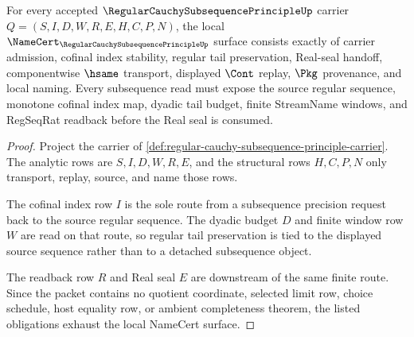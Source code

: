 \begin{theorem}
\label{thm:regular-cauchy-subsequence-principle-namecert-obligations}
For every accepted $\RegularCauchySubsequencePrincipleUp$ carrier $Q=(S,I,D,W,R,E,H,C,P,N)$, the local $\NameCert_{\RegularCauchySubsequencePrincipleUp}$ surface consists exactly of carrier admission, cofinal index stability, regular tail preservation, Real-seal handoff, componentwise $\hsame$ transport, displayed $\Cont$ replay, $\Pkg$ provenance, and local naming. Every subsequence read must expose the source regular sequence, monotone cofinal index map, dyadic tail budget, finite StreamName windows, and RegSeqRat readback before the Real seal is consumed.
\end{theorem}
\begin{proof}
Project the carrier of \autoref{def:regular-cauchy-subsequence-principle-carrier}. The analytic rows are $S,I,D,W,R,E$, and the structural rows $H,C,P,N$ only transport, replay, source, and name those rows.

The cofinal index row $I$ is the sole route from a subsequence precision request back to the source regular sequence. The dyadic budget $D$ and finite window row $W$ are read on that route, so regular tail preservation is tied to the displayed source sequence rather than to a detached subsequence object.

The readback row $R$ and Real seal $E$ are downstream of the same finite route. Since the packet contains no quotient coordinate, selected limit row, choice schedule, host equality row, or ambient completeness theorem, the listed obligations exhaust the local NameCert surface.
\end{proof}

